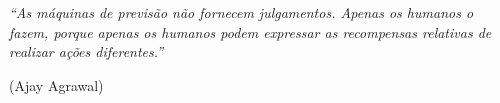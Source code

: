 \begin{epigrafe}
    \vspace*{\fill}
    \begin{flushright}
	\begin{minipage}{.50\textwidth}
		\textit{``As máquinas de previsão não fornecem julgamentos. Apenas os humanos o fazem, porque apenas os humanos podem expressar as recompensas relativas de realizar ações diferentes.''}
		\begin{flushright}(Ajay Agrawal)    \end{flushright}
    \end{minipage}
    \end{flushright}
\end{epigrafe}
